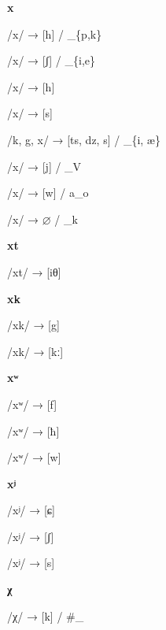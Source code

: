 \begin{center}\textbf{x}\end{center}
\begin{multicols}{4}
\noindent /x/ → [h] / \_\{p,k\}

\noindent /x/ → [ʃ] / \_\{i,e\}

\noindent /x/ → [h]

\noindent /x/ → [s]

\noindent /k, g, x/ → [ts, dz, s] / \_\{i, æ\}

\noindent /x/ → [j] / \_V

\noindent /x/ → [w] / a\_o

\noindent /x/ → $\varnothing$ / \_k
\end{multicols}


\begin{center}\textbf{xt}\end{center}
\begin{multicols}{4}
\noindent /xt/ → [iθ]
\end{multicols}


\begin{center}\textbf{xk}\end{center}
\begin{multicols}{4}
\noindent /xk/ → [g]

\noindent /xk/ → [kː]
\end{multicols}


\begin{center}\textbf{xʷ}\end{center}
\begin{multicols}{4}
\noindent /xʷ/ → [f]

\noindent /xʷ/ → [ħ]

\noindent /xʷ/ → [w]
\end{multicols}


\begin{center}\textbf{xʲ}\end{center}
\begin{multicols}{4}
\noindent /xʲ/ → [ɕ]

\noindent /xʲ/ → [ʃ]

\noindent /xʲ/ → [s]
\end{multicols}


\begin{center}\textbf{χ}\end{center}
\begin{multicols}{4}
\noindent /χ/ → [k] / \#\_
\end{multicols}


